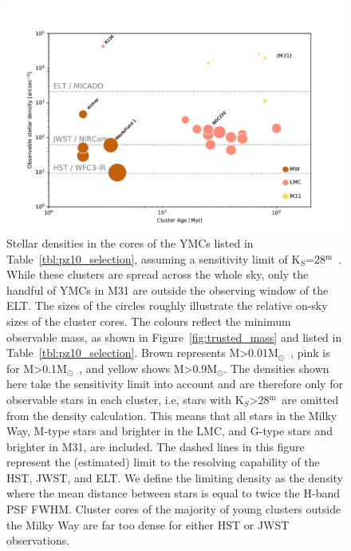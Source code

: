 \documentclass{aa}
\newcommand{\m}{$^\mathrm{m}$~}
\newcommand{\msun}{M$_\odot$~}
\newcommand{\msune}{M$_\odot$}
\begin{document}
\begin{figure}

    \centering
    \includegraphics[width=\textwidth]{star_density_vs_age.pdf}

    \caption{
    Stellar densities in the cores of the YMCs listed in Table~\ref{tbl:pz10_selection}, assuming a sensitivity limit of K$_S$=28\m.
    While these clusters are spread across the whole sky, only the handful of YMCs in M31 are outside the observing window of the ELT.
    The sizes of the circles roughly illustrate the relative on-sky sizes of the cluster cores.
    The colours reflect the minimum observable mass, as shown in Figure~\ref{fig:trusted_mass} and listed in Table~\ref{tbl:pz10_selection}.
    Brown represents M\textgreater0.01\msun, pink is for M\textgreater0.1\msun, and yellow shows M\textgreater0.9\msune.
    The densities shown here take the sensitivity limit into account and are therefore only for observable stars in each cluster, i.e, stars with K$_S$\textgreater28\m are omitted from the density calculation.
    This means that all stars in the Milky Way, M-type stars and brighter in the LMC, and G-type stars and brighter in M31, are included.
    The dashed lines in this figure represent the (estimated) limit to the resolving capability of the HST, JWST, and ELT.
    We define the limiting density as the density where the mean distance between stars is equal to twice the H-band PSF FWHM.
    Cluster cores of the majority of young clusters outside the Milky Way are far too dense for either HST or JWST observations. }

    \label{fig:star_density_vs_age}

\end{figure}
\end{document}
